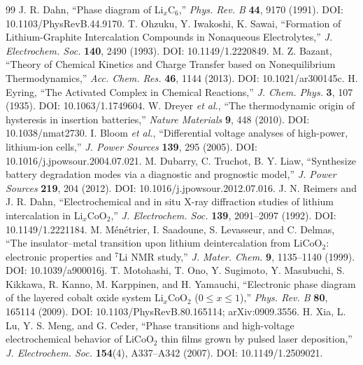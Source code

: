 \documentclass[11pt,a4paper]{article}
\begin{document}
\begin{thebibliography}{99}
 J. R. Dahn, ``Phase diagram of Li$_x$C$_6$,'' \emph{Phys. Rev. B} \textbf{44}, 9170 (1991). DOI: 10.1103/PhysRevB.44.9170.
 T. Ohzuku, Y. Iwakoshi, K. Sawai, ``Formation of Lithium-Graphite Intercalation Compounds in Nonaqueous Electrolytes,'' \emph{J. Electrochem. Soc.} \textbf{140}, 2490 (1993). DOI: 10.1149/1.2220849.
 M. Z. Bazant, ``Theory of Chemical Kinetics and Charge Transfer based on Nonequilibrium Thermodynamics,'' \emph{Acc. Chem. Res.} \textbf{46}, 1144 (2013). DOI: 10.1021/ar300145c.
 H. Eyring, ``The Activated Complex in Chemical Reactions,'' \emph{J. Chem. Phys.} \textbf{3}, 107 (1935). DOI: 10.1063/1.1749604.
 W. Dreyer \emph{et al.}, ``The thermodynamic origin of hysteresis in insertion batteries,'' \emph{Nature Materials} \textbf{9}, 448 (2010). DOI: 10.1038/nmat2730.
 I. Bloom \emph{et al.}, ``Differential voltage analyses of high-power, lithium-ion cells,'' \emph{J. Power Sources} \textbf{139}, 295 (2005). DOI: 10.1016/j.jpowsour.2004.07.021.
 M. Dubarry, C. Truchot, B. Y. Liaw, ``Synthesize battery degradation modes via a diagnostic and prognostic model,'' \emph{J. Power Sources} \textbf{219}, 204 (2012). DOI: 10.1016/j.jpowsour.2012.07.016.
 J. N. Reimers and J. R. Dahn, ``Electrochemical and in situ X-ray diffraction studies of lithium intercalation in Li$_x$CoO$_2$,'' \emph{J. Electrochem. Soc.} \textbf{139}, 2091--2097 (1992). DOI: 10.1149/1.2221184.
 M. M\'en\'etrier, I. Saadoune, S. Levasseur, and C. Delmas, ``The insulator--metal transition upon lithium deintercalation from LiCoO$_2$: electronic properties and $^7$Li NMR study,'' \emph{J. Mater. Chem.} \textbf{9}, 1135--1140 (1999). DOI: 10.1039/a900016j.
 T. Motohashi, T. Ono, Y. Sugimoto, Y. Masubuchi, S. Kikkawa, R. Kanno, M. Karppinen, and H. Yamauchi, ``Electronic phase diagram of the layered cobalt oxide system Li$_x$CoO$_2$ ($0\le x\le1$),'' \emph{Phys. Rev. B} \textbf{80}, 165114 (2009). DOI: 10.1103/PhysRevB.80.165114; arXiv:0909.3556.
 H. Xia, L. Lu, Y. S. Meng, and G. Ceder, ``Phase transitions and high-voltage electrochemical behavior of LiCoO$_2$ thin films grown by pulsed laser deposition,'' \emph{J. Electrochem. Soc.} \textbf{154}(4), A337--A342 (2007). DOI: 10.1149/1.2509021.

\end{thebibliography}
\end{document}
